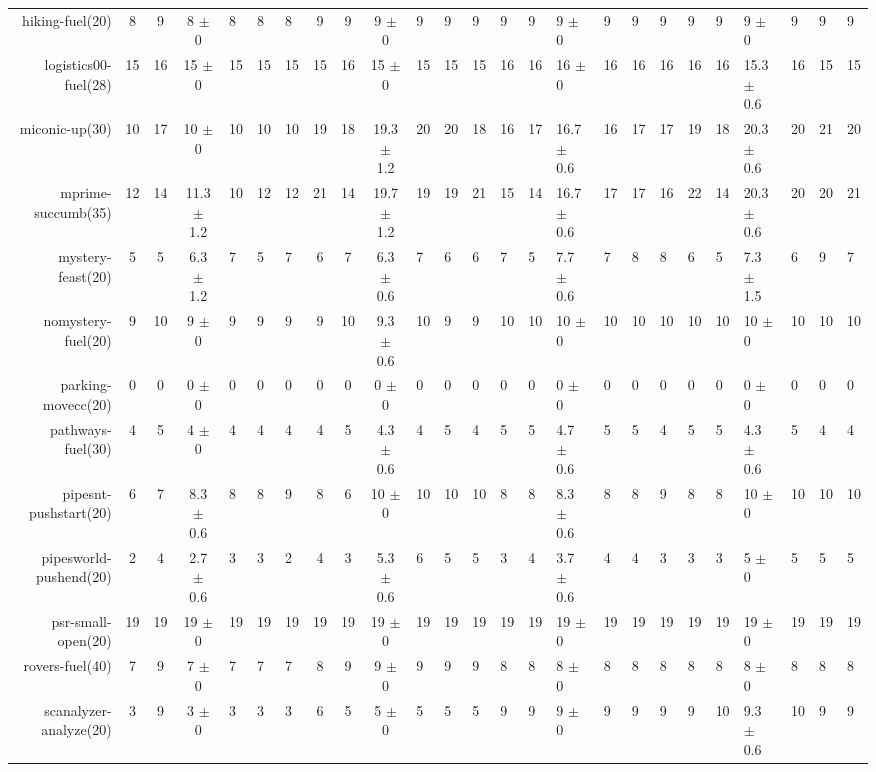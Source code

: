 \begin{center}
\begin{tabular}{|r|cccHHH|cccHHHHHHHHHHHHHHH|}
hiking-fuel(20) & 8 & 9 & 8 $\pm$ 0 & 8 & 8 & 8 & 9 & 9 & 9 $\pm$ 0 & 9 & 9 & 9 & 9 & 9 & 9 $\pm$ 0 & 9 & 9 & 9 & 9 & 9 & 9 $\pm$ 0 & 9 & 9 & 9\\
logistics00-fuel(28) & 15 & 16 & 15 $\pm$ 0 & 15 & 15 & 15 & 15 & 16 & 15 $\pm$ 0 & 15 & 15 & 15 & 16 & 16 & 16 $\pm$ 0 & 16 & 16 & 16 & 16 & 16 & 15.3 $\pm$ 0.6 & 16 & 15 & 15\\
miconic-up(30) & 10 & 17 & 10 $\pm$ 0 & 10 & 10 & 10 & 19 & 18 & 19.3 $\pm$ 1.2 & 20 & 20 & 18 & 16 & 17 & 16.7 $\pm$ 0.6 & 16 & 17 & 17 & 19 & 18 & 20.3 $\pm$ 0.6 & 20 & 21 & 20\\
mprime-succumb(35) & 12 & 14 & 11.3 $\pm$ 1.2 & 10 & 12 & 12 & 21 & 14 & 19.7 $\pm$ 1.2 & 19 & 19 & 21 & 15 & 14 & 16.7 $\pm$ 0.6 & 17 & 17 & 16 & 22 & 14 & 20.3 $\pm$ 0.6 & 20 & 20 & 21\\
mystery-feast(20) & 5 & 5 & 6.3 $\pm$ 1.2 & 7 & 5 & 7 & 6 & 7 & 6.3 $\pm$ 0.6 & 7 & 6 & 6 & 7 & 5 & 7.7 $\pm$ 0.6 & 7 & 8 & 8 & 6 & 5 & 7.3 $\pm$ 1.5 & 6 & 9 & 7\\
nomystery-fuel(20) & 9 & 10 & 9 $\pm$ 0 & 9 & 9 & 9 & 9 & 10 & 9.3 $\pm$ 0.6 & 10 & 9 & 9 & 10 & 10 & 10 $\pm$ 0 & 10 & 10 & 10 & 10 & 10 & 10 $\pm$ 0 & 10 & 10 & 10\\
parking-movecc(20) & 0 & 0 & 0 $\pm$ 0 & 0 & 0 & 0 & 0 & 0 & 0 $\pm$ 0 & 0 & 0 & 0 & 0 & 0 & 0 $\pm$ 0 & 0 & 0 & 0 & 0 & 0 & 0 $\pm$ 0 & 0 & 0 & 0\\
pathways-fuel(30) & 4 & 5 & 4 $\pm$ 0 & 4 & 4 & 4 & 4 & 5 & 4.3 $\pm$ 0.6 & 4 & 5 & 4 & 5 & 5 & 4.7 $\pm$ 0.6 & 5 & 5 & 4 & 5 & 5 & 4.3 $\pm$ 0.6 & 5 & 4 & 4\\
pipesnt-pushstart(20) & 6 & 7 & 8.3 $\pm$ 0.6 & 8 & 8 & 9 & 8 & 6 & 10 $\pm$ 0 & 10 & 10 & 10 & 8 & 8 & 8.3 $\pm$ 0.6 & 8 & 8 & 9 & 8 & 8 & 10 $\pm$ 0 & 10 & 10 & 10\\
pipesworld-pushend(20) & 2 & 4 & 2.7 $\pm$ 0.6 & 3 & 3 & 2 & 4 & 3 & 5.3 $\pm$ 0.6 & 6 & 5 & 5 & 3 & 4 & 3.7 $\pm$ 0.6 & 4 & 4 & 3 & 3 & 3 & 5 $\pm$ 0 & 5 & 5 & 5\\
psr-small-open(20) & 19 & 19 & 19 $\pm$ 0 & 19 & 19 & 19 & 19 & 19 & 19 $\pm$ 0 & 19 & 19 & 19 & 19 & 19 & 19 $\pm$ 0 & 19 & 19 & 19 & 19 & 19 & 19 $\pm$ 0 & 19 & 19 & 19\\
rovers-fuel(40) & 7 & 9 & 7 $\pm$ 0 & 7 & 7 & 7 & 8 & 9 & 9 $\pm$ 0 & 9 & 9 & 9 & 8 & 8 & 8 $\pm$ 0 & 8 & 8 & 8 & 8 & 8 & 8 $\pm$ 0 & 8 & 8 & 8\\
scanalyzer-analyze(20) & 3 & 9 & 3 $\pm$ 0 & 3 & 3 & 3 & 6 & 5 & 5 $\pm$ 0 & 5 & 5 & 5 & 9 & 9 & 9 $\pm$ 0 & 9 & 9 & 9 & 9 & 10 & 9.3 $\pm$ 0.6 & 10 & 9 & 9\\

\end{tabular}
\end{center}
